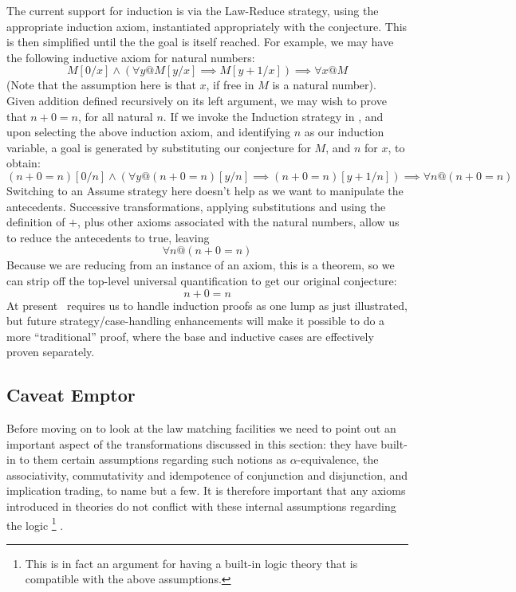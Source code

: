 The current support for induction is via the Law-Reduce strategy,
using the appropriate induction axiom, instantiated appropriately
with the conjecture. This is then simplified until the the goal is itself reached.
For example, we may have the following inductive axiom for natural numbers:
$$
 M[0/x] \land (\forall y @ M[y/x] \implies M[y+1/x]) \implies \forall x @ M
$$
(Note that the assumption here is that $x$, if free in $M$ is a natural number).
Given addition defined recursively on its left argument,
we may wish to prove that $n+0 = n$, for all natural $n$.
If we invoke the Induction strategy in \STHN, and upon selecting the above
induction axiom, and identifying $n$ as our induction variable,
a goal is generated by substituting our conjecture for $M$,
and $n$ for $x$,
to obtain:
$$
 (n+0 = n)[0/n]
 \land (\forall y @ (n+0 = n)[y/n] \implies (n+0 = n)[y+1/n])
 \implies \forall n @ (n+0 = n)
$$
Switching to an Assume strategy here doesn't help as we want to manipulate
the antecedents. Successive transformations, applying substitutions
and using the definition
of $+$, plus other axioms associated with the natural numbers, allow us
to reduce the antecedents to true, leaving
$$
 \forall n @ (n+0 = n)
$$
Because we are reducing from an instance of an axiom,
this is a theorem, so we can strip off the top-level universal quantification
to get our original conjecture:
$$
n+0 = n
$$
At present \STHN\ requires us to handle induction proofs as one lump as just illustrated,
but future strategy/case-handling enhancements will make it possible to do a more
``traditional'' proof, where the base and inductive cases are effectively
proven separately.

\subsection{Caveat Emptor}

Before moving on to look at the law matching facilities
we need to point out an important aspect of the transformations discussed
in this section: they have built-in to them certain assumptions
regarding such notions as $\alpha$-equivalence, the associativity, commutativity
and idempotence of conjunction and disjunction, and implication trading,
to name but a few.
It is therefore important that any axioms introduced in theories
do not conflict with these internal assumptions regarding the logic%
\footnote{This is in fact an argument for having a built-in logic theory
that is compatible with the above assumptions.}%
.
